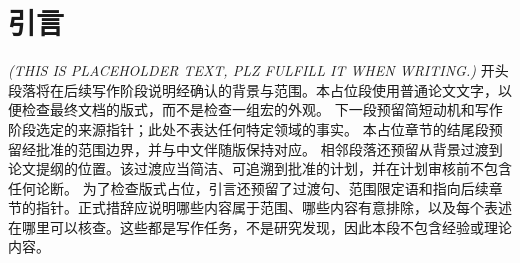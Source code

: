 \section{引言}\label{sec:introduction}
\textit{(THIS IS PLACEHOLDER TEXT, PLZ FULFILL IT WHEN WRITING.)}
开头段落将在后续写作阶段说明经确认的背景与范围。本占位段使用普通论文文字，以便检查最终文档的版式，而不是检查一组宏的外观。
下一段预留简短动机和写作阶段选定的来源指针；此处不表达任何特定领域的事实。
本占位章节的结尾段预留经批准的范围边界，并与中文伴随版保持对应。
相邻段落还预留从背景过渡到论文提纲的位置。该过渡应当简洁、可追溯到批准的计划，并在计划审核前不包含任何论断。
为了检查版式占位，引言还预留了过渡句、范围限定语和指向后续章节的指针。正式措辞应说明哪些内容属于范围、哪些内容有意排除，以及每个表述在哪里可以核查。这些都是写作任务，不是研究发现，因此本段不包含经验或理论内容。

